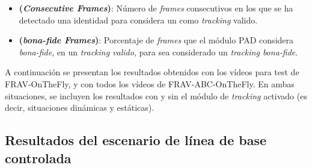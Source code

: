 \begin{itemize}
    \item 
    \textbf{ (\textit{Consecutive Frames})}: Número de \textit{frames} consecutivos en los que se ha detectado una identidad para considera un  como \textit{tracking} valido.
    \item 
    \textbf{ (\textit{\Gls{bona-fide} Frames})}: Porcentaje de \textit{frames} que el módulo \gls{PAD} considera \textit{bona-fide}, en un \textit{tracking valido}, para sea considerado un \textit{tracking bona-fide}.
\end{itemize}

A continuación se presentan los resultados obtenidos con los vídeos para test de \Gls{FRAV-OnTheFly}, y con todos los vídeos de \Gls{FRAV-ABC-OnTheFly}. En ambas situaciones, se incluyen los resultados con y sin el módulo de \textit{tracking} activado (es decir, situaciones dinámicas y estáticas).

\subsection{Resultados del escenario de línea de base controlada}%

